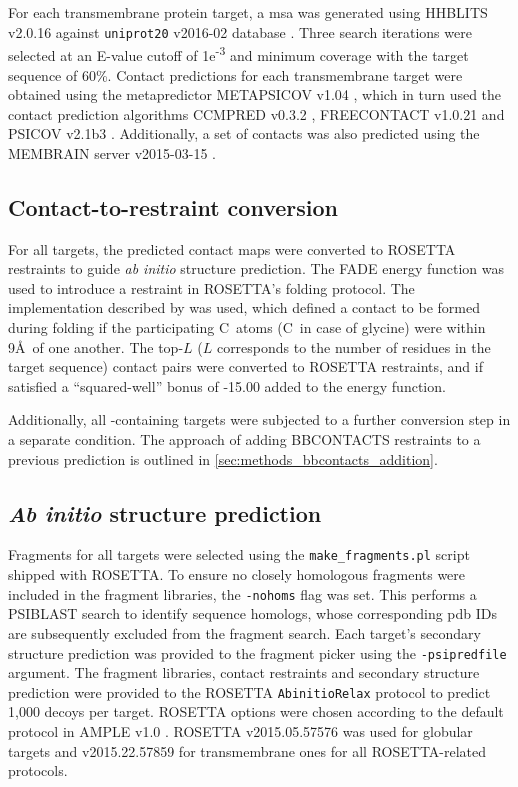 For each transmembrane protein target, a \gls{msa} was generated using HHBLITS v2.0.16 \cite{Remmert2011-kt} against \texttt{uniprot20} v2016-02 database \cite{The_UniProt_Consortium2017-pb}. Three search iterations were selected at an E-value cutoff of 1e\textsuperscript{-3} and minimum coverage with the target sequence of 60\%. Contact predictions for each transmembrane target were obtained using the metapredictor METAPSICOV v1.04 \cite{Jones2015-vq}, which in turn used the contact prediction algorithms CCMPRED v0.3.2 \cite{Seemayer2014-zp}, FREECONTACT v1.0.21 \cite{Kajan2014-bx} and PSICOV v2.1b3 \cite{Jones2012-ks}. Additionally, a set of contacts was also predicted using the MEMBRAIN server v2015-03-15 \cite{Yang2013-bf}.

\subsection{Contact-to-restraint conversion} \label{sec:ample_proof_con2res}
For all targets, the predicted contact maps were converted to ROSETTA restraints to guide \textit{ab initio} structure prediction. The FADE energy function was used to introduce a restraint in ROSETTA's folding protocol. The implementation described by \textcite{Michel2014-eg} was used, which defined a contact to be formed during folding if the participating C\textbeta\ atoms (C\textalpha\ in case of glycine) were within 9\AA\ of one another. The top-$L$ ($L$ corresponds to the number of residues in the target sequence) contact pairs were converted to ROSETTA restraints, and if satisfied a ``squared-well'' bonus of -15.00 added to the energy function.

Additionally, all \textbeta-containing targets were subjected to a further conversion step in a separate condition. The approach of adding BBCONTACTS restraints to a previous prediction is outlined in \cref{sec:methods_bbcontacts_addition}.

\subsection{\textit{Ab initio} structure prediction}
Fragments for all targets were selected using the \texttt{make\_fragments.pl} script shipped with ROSETTA. To ensure no closely homologous fragments were included in the fragment libraries, the \texttt{-nohoms} flag was set. This performs a PSIBLAST search to identify sequence homologs, whose corresponding \gls{pdb} IDs are subsequently excluded from the fragment search. Each target's secondary structure prediction was provided to the fragment picker using the \texttt{-psipredfile} argument. The fragment libraries, contact restraints and secondary structure prediction were provided to the ROSETTA \texttt{AbinitioRelax} protocol \cite{Rohl2004-dj} to predict 1,000 decoys per target. ROSETTA options were chosen according to the default protocol in AMPLE v1.0 \cite{Bibby2012-lm}. ROSETTA v2015.05.57576 was used for globular targets and v2015.22.57859 for transmembrane ones for all ROSETTA-related protocols.
 

